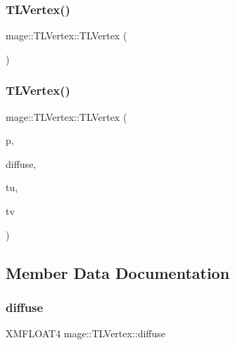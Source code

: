 \subsubsection{\texorpdfstring{T\+L\+Vertex()}{TLVertex()}\hspace{0.1cm}{\footnotesize\ttfamily [1/2]}}
{\footnotesize\ttfamily mage\+::\+T\+L\+Vertex\+::\+T\+L\+Vertex (\begin{DoxyParamCaption}{ }\end{DoxyParamCaption})}

\hypertarget{structmage_1_1_t_l_vertex_a13e51ade415e514fce0065684e69b639}{}\label{structmage_1_1_t_l_vertex_a13e51ade415e514fce0065684e69b639} 
\subsubsection{\texorpdfstring{T\+L\+Vertex()}{TLVertex()}\hspace{0.1cm}{\footnotesize\ttfamily [2/2]}}
{\footnotesize\ttfamily mage\+::\+T\+L\+Vertex\+::\+T\+L\+Vertex (\begin{DoxyParamCaption}\item[{X\+M\+F\+L\+O\+A\+T4}]{p,  }\item[{X\+M\+F\+L\+O\+A\+T4}]{diffuse,  }\item[{float}]{tu,  }\item[{float}]{tv }\end{DoxyParamCaption})}



\subsection{Member Data Documentation}
\hypertarget{structmage_1_1_t_l_vertex_a78d60c6622bc1091f2c1c30da0715236}{}\label{structmage_1_1_t_l_vertex_a78d60c6622bc1091f2c1c30da0715236} 
\subsubsection{\texorpdfstring{diffuse}{diffuse}}
{\footnotesize\ttfamily X\+M\+F\+L\+O\+A\+T4 mage\+::\+T\+L\+Vertex\+::diffuse}

\hypertarget{structmage_1_1_t_l_vertex_a5ac68e9f9767dae9455134891712baf1}{}\label{structmage_1_1_t_l_vertex_a5ac68e9f9767dae9455134891712baf1} 
